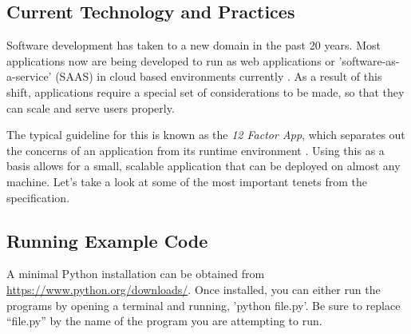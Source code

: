 \documentclass[12pt, oneside, a4paper]{book}
\begin{document}
      \section{Current Technology and Practices}
      Software development has taken to a new domain in the past 20 years.
      Most applications now are being developed to run as web applications or 'software-as-a-service' (SAAS) in cloud based environments currently \autocite{WhatCloudComputing}.
      As a result of this shift, applications require a special set of considerations to be made, so that they can scale and serve users properly.

      The typical guideline for this is known as the \textit{12 Factor App\footnotemark}, which separates out the concerns of an application from its runtime environment \autocite{wigginsTwelveFactorApp2017}.
      Using this as a basis allows for a small, scalable application that can be deployed on almost any machine.
      Let's take a look at some of the most important tenets from the specification.

   \appendix
   \begin{appendices}
   \chapter{Running Example Code}
   A minimal Python installation can be obtained from \url{https://www.python.org/downloads/}.
   Once installed, you can either run the programs by opening a terminal and running, 'python file.py'.
   Be sure to replace ``file.py'' by the name of the program you are attempting to run.
\newpage
{}
\printbibliography[title={Works Cited},heading=bibintoc]
   \end{appendices}
\end{document}
